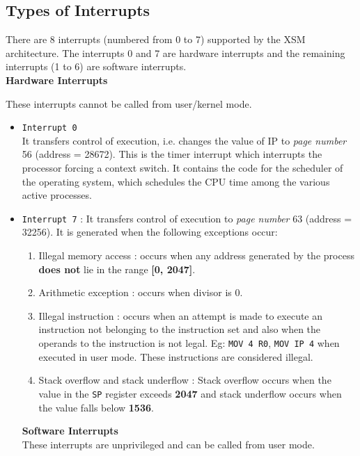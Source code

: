 \documentclass[11pt]{article}
\begin{document}
\subsection{Types of Interrupts}
There are 8 interrupts (numbered from 0 to 7) supported by the XSM architecture. The interrupts 0 and 7 are hardware interrupts and the remaining interrupts (1 to 6) are software interrupts.\\

\textbf{Hardware Interrupts }

These interrupts cannot be called from user/kernel mode.
\begin{itemize}
\item \texttt{Interrupt 0} \\
It transfers control of execution, i.e. changes the value of IP to \textit{page number} 56 (address = 28672). This is the timer interrupt which interrupts the processor forcing a context switch. It contains the code for the scheduler of the operating system, which schedules the CPU time among the various active processes.

\item \texttt{Interrupt 7} : It transfers control of execution to \textit{page number} 63 (address = 32256). It is generated when the following exceptions occur:
\begin{enumerate}

\item Illegal memory access : occurs when any address generated by the process \textbf{does not} lie in the range \textbf{[0, 2047]}.
\item Arithmetic exception : occurs when divisor is 0.
\item Illegal instruction : occurs when an attempt is made to execute an instruction not belonging to the instruction set and also when the operands to the instruction is not legal. Eg: \texttt{MOV 4 R0}, \texttt{MOV IP 4} when executed in user mode. These instructions are considered illegal.
\item Stack overflow and stack underflow : Stack overflow occurs when the value in the \texttt{SP} register exceeds \textbf{2047} and stack underflow occurs when the value falls below \textbf{1536}.
\end{enumerate}
\textbf{Software Interrupts } \\
These interrupts are unprivileged and can be called from user mode.


\end{itemize}
\end{document}
